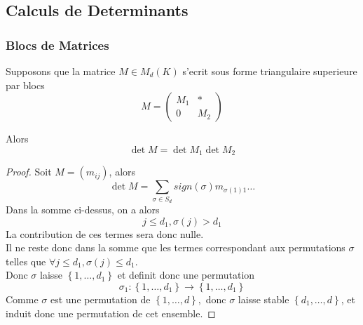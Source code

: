 \documentclass[../main.tex]{subfiles}
\begin{document}
\subsection{Calculs de Determinants}
\subsubsection{Blocs de Matrices}
\begin{thm}
	Supposons que la matrice $M \in M_d( K) $ s'ecrit sous forme triangulaire superieure par blocs
	\[ 
	M = 
	\begin{pmatrix}
		M_1 & *\\
		0 & M_2
	\end{pmatrix}
	\]
	
Alors
\[ 
\det M = \det M_1 \det M_2
\]

\end{thm}
\begin{proof}
	Soit $M= ( m_{ij} ) $, alors
	\[ 
		\det M = \sum_{\sigma \in S_d} sign( \sigma) m_{\sigma( 1) 1} \ldots 
	\]
	Dans la somme ci-dessus, on a alors
	\[ 
		j \leq d_1, \sigma( j) > d_1
	\]
	La contribution de ces termes sera donc nulle.\\
	Il ne reste donc dans la somme que les termes correspondant aux permutations $\sigma$ telles que $\forall j \leq d_1, \sigma( j) \leq d_1$.\\
	Donc $\sigma$ laisse $ \left\{ 1, \ldots, d_1 \right\} $ et definit donc une permutation
	\[ 
	\sigma_1: \left\{ 1, \ldots, d_1 \right\} \to \left\{ 1, \ldots , d_1 \right\} 
	\]
Comme $\sigma$ est une permutation de $ \left\{ 1, \ldots, d \right\} , $ donc  $\sigma$ laisse stable $ \left\{ d_1, \ldots, d \right\} $, et induit donc une permutation de cet ensemble.
\end{proof}
\end{document}
